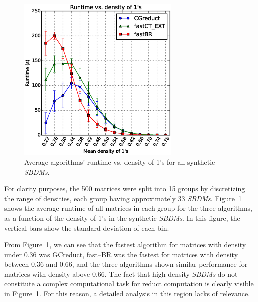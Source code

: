 \documentclass[number,preprint,review,12pt]{elsarticle}
\begin{document}
	\begin{figure}[htb]
		\begin{center}
			\includegraphics[height=8cm]{overal.eps}
		\end{center}
		\caption{Average algorithms' runtime vs. density of 1's for all synthetic \textit{SBDMs}.}
		\label{fig:scattDensity}
	\end{figure}	

	For clarity purposes, the 500 matrices were split into 15 groups by discretizing the range of densities, each group having approximately 33 \textit{SBDMs}. Figure~\ref{fig:scattDensity} shows the average runtime of all  matrices in each group for the three algorithms, as a function of the density of 1's in the synthetic \textit{SBDMs}. In this figure, the vertical bars show the standard deviation of each bin. 
		
	From Figure~\ref{fig:scattDensity}, we can see that the fastest algorithm for matrices with density under 0.36 was GCreduct, fast--BR was the fastest for matrices with density between 0.36 and 0.66, and the three algorithms shown similar performance for matrices with density above 0.66. The fact that high density \textit{SBDMs} do not constitute a complex computational task for reduct computation \citep{Rojas12} is clearly visible in Figure~\ref{fig:scattDensity}. For this reason, a detailed analysis in this region lacks of relevance.
		
\end{document}
